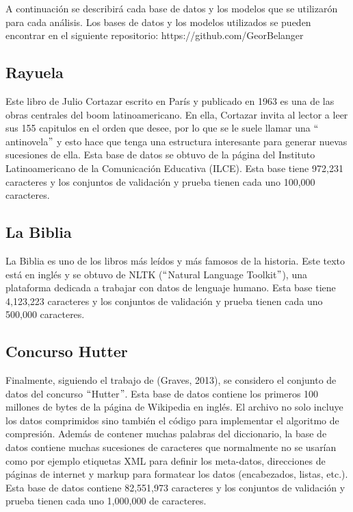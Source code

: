 A continuación se describirá cada base de datos y los modelos que se utilizarón para cada análisis. Los bases de datos y los modelos utilizados se pueden encontrar en el siguiente repositorio: https://github.com/GeorBelanger

\subsection{Rayuela}
Este libro de Julio Cortazar escrito en París y publicado en 1963 es una de las obras centrales del boom latinoamericano. En ella, Cortazar invita al lector a leer sus 155 capitulos en el orden que desee, por lo que se le suele llamar una $``$antinovela$"$ y esto hace que tenga una estructura interesante para generar nuevas sucesiones de ella.
Esta base de datos se obtuvo de la página del Instituto Latinoamericano de la Comunicación Educativa (ILCE). Esta base tiene 972,231 caracteres y los conjuntos de validación y prueba tienen cada uno 100,000 caracteres.
\cite{rayuela}
\cite{cortazar}


\subsection{La Biblia}
La Biblia es uno de los libros más leídos y más famosos de la historia. Este texto está en inglés y se obtuvo de NLTK ($``$Natural Language Toolkit$"$), una plataforma dedicada a trabajar con datos de lenguaje humano. Esta base tiene 4,123,223 caracteres y los conjuntos de validación y prueba tienen cada uno 500,000 caracteres.
\cite{nltk}

\subsection{Concurso Hutter}
Finalmente, siguiendo el trabajo de (Graves, 2013), se considero el conjunto de datos del concurso $``$Hutter$"$. Esta base de datos contiene los primeros 100 millones de bytes de la página de Wikipedia en inglés. El archivo no solo incluye los datos comprimidos sino también el código para implementar el algoritmo de compresión. Además de contener muchas palabras del diccionario, la base de datos contiene muchas sucesiones de caracteres que normalmente no se usarían como por ejemplo etiquetas XML para definir los meta-datos, direcciones de páginas de internet y markup para formatear los datos (encabezados, listas, etc.). Esta base de datos contiene 82,551,973 caracteres y los conjuntos de validación y prueba tienen cada uno 1,000,000 de caracteres.
\cite{DBLP:journals/corr/Graves13}


